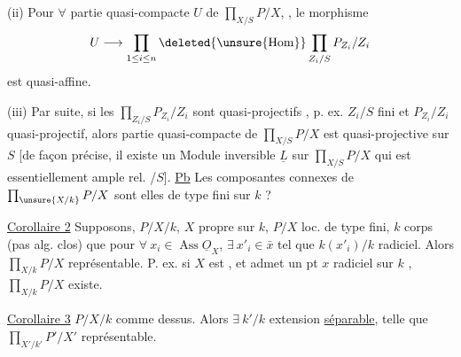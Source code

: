  (ii) Pour $\forall$ partie  quasi-compacte $U$ de
$\displaystyle\prod_{X/S}P/X$, ,
le morphisme
\[
U\longrightarrow\prod_{1\leq i\leq n}\deleted{\unsure{\operatorname{Hom}}}\prod_{Z_i/S}P_{Z_i}/Z_i
\]
est quasi-affine.

(iii) Par suite, si les
$\displaystyle\prod_{Z_i/S}P_{Z_i}/Z_i$ sont quasi-projectifs  ,
p. ex. $Z_i/S$ fini et $P_{Z_i}/Z_i$
quasi-projectif, alors  partie quasi-compacte de
$\displaystyle\prod_{X/S}P/X$ est quasi-projective sur $S$ [de façon précise, il
existe un Module inversible $\underline L$ sur $\displaystyle\prod_{X/S}P/X$ qui est
essentiellement ample rel. /$S$].
\uline{Pb} Les composantes connexes de $\prod_{\unsure{X/k}}P/X$ sont elles de type fini sur $k$ ?

\uline{Corollaire 2} Supposons,    $P/X/k$, $X$ propre sur $k$, $P/X$ loc. de type fini, $k$ corps (pas   alg. clos) que \deleted{$\forall$} pour $\forall\ x_i\in\operatorname{Ass}\underline{O}_X$, $\exists\ x'_i\in\bar x$ tel que $k(x'_i)/k$ radiciel.  Alors $\prod_{X/k}P/X$ représentable.
P. ex. si $X$  est  , et admet un pt $x$ radiciel sur $k$ , $\prod_{X/k}P/X$ existe.

\uline{Corollaire 3} $P/X/k$ comme dessus. Alors $\exists\ k'/k$ extension  \uline{séparable}, telle que $\prod_{X'/k'}P'/X'$ représentable.


